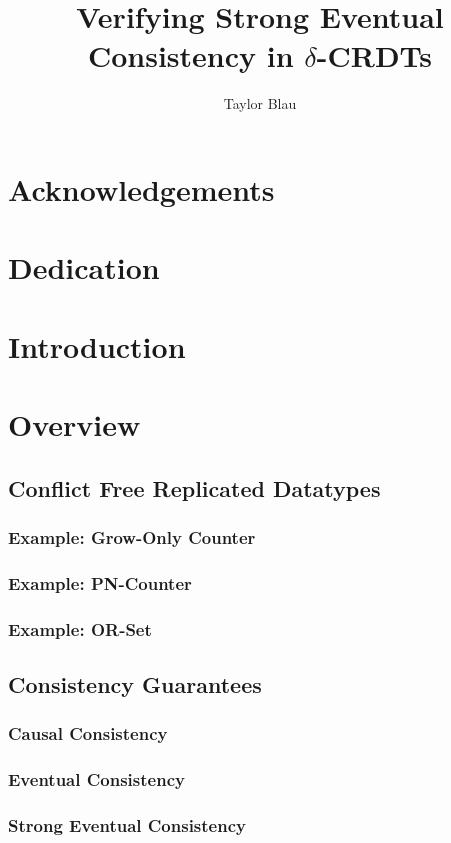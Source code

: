 \documentclass{thesis}
\title{Verifying Strong Eventual Consistency in $\delta$-CRDTs}
\author{Taylor Blau}
\begin{document}

  

  \frontmatter
  \cleardoublepage

  
  \chapter{Acknowledgements}
  \chapter{Dedication}

  \tableofcontents

  \mainmatter
  \chapter{Introduction}

  \chapter{Overview}
  \section{Conflict Free Replicated Datatypes}
  \subsection{Example: Grow-Only Counter}
  \subsection{Example: PN-Counter}
  \subsection{Example: OR-Set}
  \section{Consistency Guarantees}
  \subsection{Causal Consistency}
  \subsection{Eventual Consistency}
  \subsection{Strong Eventual Consistency}
\end{document}
